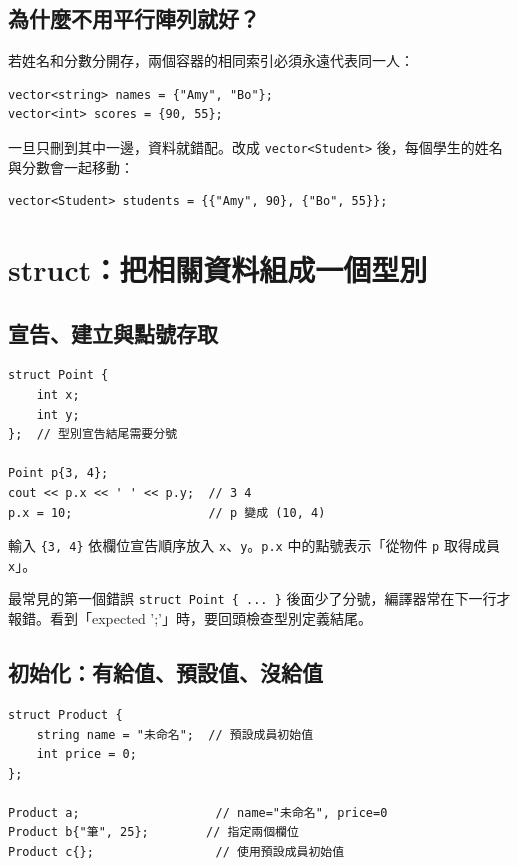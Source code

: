 \documentclass[11pt,a4paper]{article}
\newcommand{\code}[1]{\texttt{#1}}
\begin{document}
\subsection{為什麼不用平行陣列就好？}

若姓名和分數分開存，兩個容器的相同索引必須永遠代表同一人：

\begin{lstlisting}
vector<string> names = {"Amy", "Bo"};
vector<int> scores = {90, 55};
\end{lstlisting}

一旦只刪到其中一邊，資料就錯配。改成 \code{vector<Student>} 後，每個學生的姓名與分數會一起移動：

\begin{lstlisting}
vector<Student> students = {{"Amy", 90}, {"Bo", 55}};
\end{lstlisting}

\section{struct：把相關資料組成一個型別}

\subsection{宣告、建立與點號存取}

\begin{lstlisting}
struct Point {
    int x;
    int y;
};  // 型別宣告結尾需要分號

Point p{3, 4};
cout << p.x << ' ' << p.y;  // 3 4
p.x = 10;                   // p 變成 (10, 4)
\end{lstlisting}

輸入 \code{\{3, 4\}} 依欄位宣告順序放入 \code{x}、\code{y}。\code{p.x} 中的點號表示「從物件 \code{p} 取得成員 \code{x}」。

\begin{warnbox}{最常見的第一個錯誤}
\code{struct Point \{ ... \}} 後面少了分號，編譯器常在下一行才報錯。看到「expected ';'」時，要回頭檢查型別定義結尾。
\end{warnbox}

\subsection{初始化：有給值、預設值、沒給值}

\begin{lstlisting}
struct Product {
    string name = "未命名";  // 預設成員初始值
    int price = 0;
};

Product a;                   // name="未命名", price=0
Product b{"筆", 25};        // 指定兩個欄位
Product c{};                 // 使用預設成員初始值
\end{lstlisting}
\end{document}
